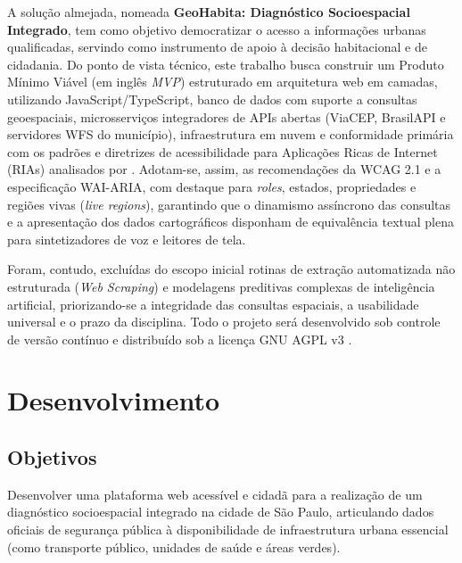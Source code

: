 \documentclass[
    12pt,
    oneside,            %
    a4paper,
    brazilian
    ]{abntex2}
\begin{document}
A solução almejada, nomeada \textbf{GeoHabita: Diagnóstico Socioespacial Integrado}, tem como objetivo democratizar o acesso a informações urbanas qualificadas, servindo como instrumento de apoio à decisão habitacional e de cidadania. Do ponto de vista técnico, este trabalho busca construir um Produto Mínimo Viável (em inglês \emph{MVP}) estruturado em arquitetura web em camadas, utilizando JavaScript/TypeScript, banco de dados com suporte a consultas geoespaciais, microsserviços integradores de APIs abertas (ViaCEP, BrasilAPI e servidores WFS do município), infraestrutura em nuvem e conformidade primária com os padrões e diretrizes de acessibilidade para Aplicações Ricas de Internet (RIAs) analisados por . Adotam-se, assim, as recomendações da WCAG 2.1 e a especificação WAI-ARIA, com destaque para \emph{roles}, estados, propriedades e regiões vivas (\emph{live regions}), garantindo que o dinamismo assíncrono das consultas e a apresentação dos dados cartográficos disponham de equivalência textual plena para sintetizadores de voz e leitores de tela.

Foram, contudo, excluídas do escopo inicial rotinas de extração automatizada não estruturada (\emph{Web Scraping}) e modelagens preditivas complexas de inteligência artificial, priorizando-se a integridade das consultas espaciais, a usabilidade universal e o prazo da disciplina. Todo o projeto será desenvolvido sob controle de versão contínuo e distribuído sob a licença GNU AGPL v3 \cite{agplv3}.


\section{Desenvolvimento}

\hfill

\subsection{Objetivos}

Desenvolver uma plataforma web acessível e cidadã para a realização de um diagnóstico socioespacial integrado na cidade de São Paulo, articulando dados oficiais de segurança pública à disponibilidade de infraestrutura urbana essencial (como transporte público, unidades de saúde e áreas verdes).
\end{document}
